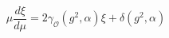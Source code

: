 \begin{equation}  \label{d1}
\mu\frac{d\xi}{d\mu}=2\gamma_{\mathcal{O}}(g^{2},\alpha)\xi+\delta(g^{2},%
\alpha)
\end{equation}

